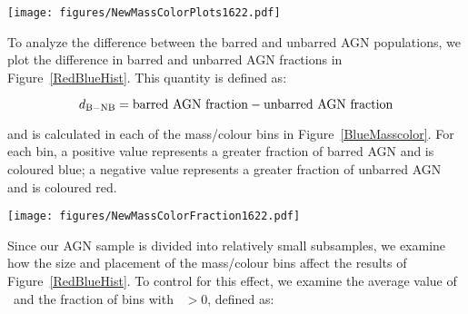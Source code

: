 \begin{figure*}
\texttt{[image: figures/NewMassColorPlots1622.pdf]}
\caption{Optical colour vs. stellar mass for disc galaxies in GZ2. Black contours represent all disc galaxies (top), all barred galaxies (middle), or all unbarred galaxies (bottom). All AGN (top), barred AGN (middle), and unbarred AGN (bottom) are plotted in the left panels as blue dots; the right panels show the AGN fraction in each colour/mass bin. Bins with $N_{AGN}<10$ are masked.}
\label{BlueMasscolor}
\end{figure*}

To analyze the difference between the barred and unbarred AGN populations, we plot the difference in barred and unbarred AGN fractions in Figure~\ref{RedBlueHist}. This quantity is defined as:


\begin{equation}
d_{\rm{B-NB}}=\rm{barred~AGN~fraction - unbarred~AGN~fraction} 
\end{equation}

\noindent and is calculated in each of the mass/colour bins in Figure~\ref{BlueMasscolor}. For each bin, a positive value represents a greater fraction of barred AGN and is coloured blue; a negative value represents a greater fraction of unbarred AGN and is coloured red.

\begin{figure*}
\texttt{[image: figures/NewMassColorFraction1622.pdf]}
\caption{Optical colour vs. stellar mass for barred and unbarred disc galaxies in GZ2. Coloured bins show the difference between the AGN fractions for barred and unbarred galaxies. Blue bins have higher fractions of barred galaxies, red bins have more unbarred galaxies, and pale/white indicates no difference. The region on the colourbar enclosed by the dotted lines represents the mean of the data determined by the Anderson-Darling test. The colour gradient is on the same scale as Figure~\ref{BlueMasscolor}. Bins with $N_{AGN}<10$ are masked. A colour version of this plot may be found in the electronic edition of the journal.}
\label{RedBlueHist}
\end{figure*}

Since our AGN sample is divided into relatively small subsamples, we examine how the size and placement of the mass/colour bins affect the results of Figure~\ref{RedBlueHist}. To control for this effect, we examine the average value of \db~and the fraction of bins with \db~$>0$, defined as:

